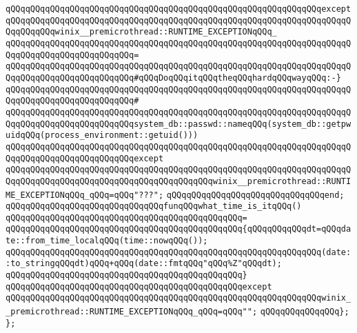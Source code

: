 \verb|qQQqqQQqqQQqqQQqqQQqqQQqqQQqqQQqqQQqqQQqqQQqqQQqqQQqqQQqqQQqqQQqexcept|\newline
\verb|qQQqqQQqqQQqqQQqqQQqqQQqqQQqqQQqqQQqqQQqqQQqqQQqqQQqqQQqqQQqqQQqqQQqqQQqqQQqqQQqwinix__premicrothread::RUNTIME_EXCEPTIONqQQq_|\newline
\verb|qQQqqQQqqQQqqQQqqQQqqQQqqQQqqQQqqQQqqQQqqQQqqQQqqQQqqQQqqQQqqQQqqQQqqQQqqQQqqQQqqQQqqQQqqQQqqQQq=|\newline
\verb|qQQqqQQqqQQqqQQqqQQqqQQqqQQqqQQqqQQqqQQqqQQqqQQqqQQqqQQqqQQqqQQqqQQqqQQqqQQqqQQqqQQqqQQqqQQqqQQq#qQQqDoqQQqitqQQqtheqQQqhardqQQqwayqQQq:-}|\newline
\verb|qQQqqQQqqQQqqQQqqQQqqQQqqQQqqQQqqQQqqQQqqQQqqQQqqQQqqQQqqQQqqQQqqQQqqQQqqQQqqQQqqQQqqQQqqQQqqQQq#|\newline
\verb|qQQqqQQqqQQqqQQqqQQqqQQqqQQqqQQqqQQqqQQqqQQqqQQqqQQqqQQqqQQqqQQqqQQqqQQqqQQqqQQqqQQqqQQqqQQqqQQqsystem_db::passwd::nameqQQq(system_db::getpwuidqQQq(process_environment::getuid()))|\newline
\verb|qQQqqQQqqQQqqQQqqQQqqQQqqQQqqQQqqQQqqQQqqQQqqQQqqQQqqQQqqQQqqQQqqQQqqQQqqQQqqQQqqQQqqQQqqQQqqQQqexcept|\newline
\verb|qQQqqQQqqQQqqQQqqQQqqQQqqQQqqQQqqQQqqQQqqQQqqQQqqQQqqQQqqQQqqQQqqQQqqQQqqQQqqQQqqQQqqQQqqQQqqQQqqQQqqQQqqQQqqQQqwinix__premicrothread::RUNTIME_EXCEPTIONqQQq_qQQq=qQQq"???";|\newline
\newline
\verb|qQQqqQQqqQQqqQQqqQQqqQQqqQQqqQQqend;|\newline
\newline
\newline
\verb|qQQqqQQqqQQqqQQqqQQqqQQqqQQqqQQqfunqQQqwhat_time_is_itqQQq()|\newline
\verb|qQQqqQQqqQQqqQQqqQQqqQQqqQQqqQQqqQQqqQQqqQQqqQQq=|\newline
\verb|qQQqqQQqqQQqqQQqqQQqqQQqqQQqqQQqqQQqqQQqqQQqqQQq{qQQqqQQqqQQqdt=qQQqdate::from_time_localqQQq(time::nowqQQq());|\newline
\verb|qQQqqQQqqQQqqQQqqQQqqQQqqQQqqQQqqQQqqQQqqQQqqQQqqQQqqQQqqQQqqQQq(date::to_stringqQQqdt)qQQq+qQQq(date::fmtqQQq"qQQq%Z"qQQqdt);|\newline
\verb|qQQqqQQqqQQqqQQqqQQqqQQqqQQqqQQqqQQqqQQqqQQqqQQq}|\newline
\verb|qQQqqQQqqQQqqQQqqQQqqQQqqQQqqQQqqQQqqQQqqQQqqQQqexcept|\newline
\verb|qQQqqQQqqQQqqQQqqQQqqQQqqQQqqQQqqQQqqQQqqQQqqQQqqQQqqQQqqQQqqQQqwinix__premicrothread::RUNTIME_EXCEPTIONqQQq_qQQq=qQQq"";|\newline
\newline
\verb|qQQqqQQqqQQqqQQq};|\newline
\verb|};|\newline
\newline
\newline
\newline
\newline
\newline
\newline
\newline
\newline
\newline

